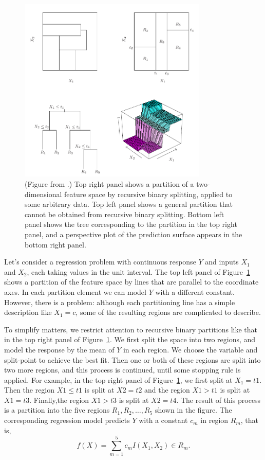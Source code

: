 \begin{figure}[h!tb]
    \begin{center}
        \includegraphics[width=0.8\textwidth]{figures/basics_decision_tree}
    \end{center}
    \caption{(Figure from \cite{hastie2008statisticallearning}.)
    Top right panel shows a partition of a two-dimensional
    feature space by recursive binary splitting, applied to
    some arbitrary data. Top left panel shows a general partition that cannot be
    obtained from recursive binary splitting. Bottom left panel shows the tree
    corresponding to the partition in the top right panel, and a perspective
    plot of the prediction surface appears in the bottom right panel.}
    \label{fig:basics_decision_tree}
\end{figure}
Let's consider a regression problem with continuous response $Y$ and inputs
$X_1$ and $X_2$, each taking values in the unit interval. The top left panel of
Figure~\ref{fig:basics_decision_tree} shows a partition of the feature space by
lines that are parallel to the coordinate axes. In each partition element we can
model $Y$ with a different constant. However, there is a problem: although each
partitioning line has a simple description like $X_1 = c$, some of the resulting
regions are complicated to describe.

To simplify matters, we restrict attention to recursive binary partitions like
that in the top right panel of Figure~\ref{fig:basics_decision_tree}. We first
split the space into two regions, and model the response by the mean of $Y$ in
each region. We choose the variable and split-point to achieve the best fit.
Then one or both of these regions are split into two more regions, and this
process is continued, until some stopping rule is applied. For example, in the
top right panel of Figure~\ref{fig:basics_decision_tree}, we first split at
$X_1 = t1$. Then the region $X1 \le t1$ is split at $X2 = t2$ and the region
$X1 > t1$ is split at $X1 = t3$. Finally,the region $X1 > t3$ is split at
$X2 = t4$. The result of this process is a partition into the five
regions $R_1, R_2, \ldots, R_5$ shown in the figure. The corresponding regression
model predicts $Y$ with a constant $c_m$ in region $R_m$, that is,
$$
    f(X) = \sum_{m=1}^{5} c_m I{(X_1, X_2) \in R_m}.
$$

